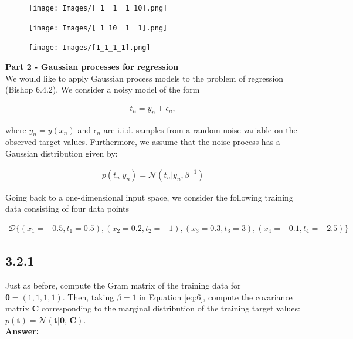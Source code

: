 \documentclass[a4paper]{article}
\begin{document}
\begin{figure}[H]
\texttt{[image: Images/[\_1\_\_1\_\_1\_10].png]}
\end{figure}

\begin{figure}[H]
\texttt{[image: Images/[\_1\_10\_\_1\_\_1].png]}
\end{figure}

\begin{figure}[H]
\texttt{[image: Images/[1\_1\_1\_1].png]}
\end{figure}

\textbf{Part 2 - Gaussian processes for regression}\\

We would like to apply Gaussian process models to the problem of regression (Bishop 6.4.2). We consider a noisy model of the form 

\begin{align*}
t_n = y_n + \epsilon_n,
\end{align*}

where $y_n = y(x_n)$ and $\epsilon_n$ are i.i.d. samples from a random noise variable on the observed target values. Furthermore, we assume that the noise process has a Gaussian distribution given by:

\begin{eqnarray} \label{eq:6}
p(t_n | y_n) = \mathcal{N}(t_n | y_n, \beta^{-1})
\end{eqnarray}

Going back to a one-dimensional input space, we consider the following training data consisting of four data points 

\begin{align*}
\mathcal{D} \{ (x_1 = -0.5, t_1 = 0.5), (x_2 = 0.2, t_2 = -1), (x_3 = 0.3, t_3 = 3),(x_4 = -0.1, t_4 = -2.5) \}
\end{align*}


\subsection*{3.2.1}

Just as before, compute the Gram matrix of the training data for $\boldsymbol{\theta} = (1,1,1,1)$. Then, taking $\beta = 1$ in Equation \ref{eq:6}, compute the covariance matrix \textbf{C} corresponding to the marginal distribution of the training target values: $p(\textbf{t}) = \mathcal{N}(\textbf{t} | \textbf{0, C})$.\\

\textbf{Answer:}\\
\end{document}
